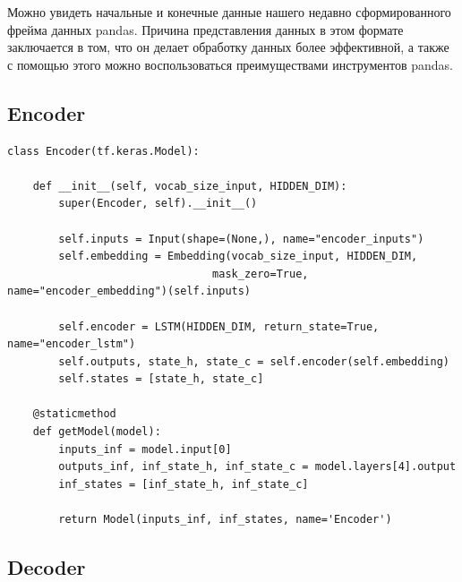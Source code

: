	Можно увидеть начальные и конечные данные нашего недавно сформированного фрейма данных pandas. Причина представления данных в этом формате заключается в том, что он делает обработку данных более эффективной, а также с помощью этого можно воспользоваться преимуществами инструментов pandas.
	
	\subsection{Encoder}
    
    \begin{lstlisting}[language=iPython]
class Encoder(tf.keras.Model):
    
    def __init__(self, vocab_size_input, HIDDEN_DIM):
        super(Encoder, self).__init__()
        
        self.inputs = Input(shape=(None,), name="encoder_inputs")
        self.embedding = Embedding(vocab_size_input, HIDDEN_DIM, 
                                mask_zero=True, name="encoder_embedding")(self.inputs)
        
        self.encoder = LSTM(HIDDEN_DIM, return_state=True, name="encoder_lstm")
        self.outputs, state_h, state_c = self.encoder(self.embedding)
        self.states = [state_h, state_c]
    
    @staticmethod
    def getModel(model):
        inputs_inf = model.input[0]
        outputs_inf, inf_state_h, inf_state_c = model.layers[4].output
        inf_states = [inf_state_h, inf_state_c]
        
        return Model(inputs_inf, inf_states, name='Encoder')  \end{lstlisting}

    \subsection{Decoder}
	
